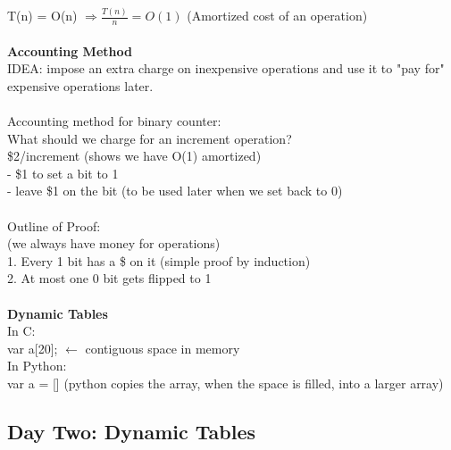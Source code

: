 \documentclass{article}
\begin{document}
	T(n) = O(n) $\Rightarrow \frac{T(n)}{n} = O(1)$ (Amortized cost of an operation)\\\\
	\textbf{Accounting Method\\}
	IDEA: impose an extra charge on inexpensive operations and use it to "pay for" expensive operations later.\\\\
	Accounting method for binary counter:\\
	What should we charge for an increment operation?\\
	\$2/increment (shows we have O(1) amortized)\\
	- \$1 to set a bit to 1\\
	- leave \$1 on the bit (to be used later when we set back to 0)\\\\
	Outline of Proof:\\
	(we always have money for operations)\\
	1. Every 1 bit has a \$ on it (simple proof by induction)\\
	2. At most one 0 bit gets flipped to 1\\\\
	\textbf{Dynamic Tables\\}
	In C:\\
	var a[20]; $\leftarrow$ contiguous space in memory\\
	In Python:\\
	var a = [] (python copies the array, when the space is filled, into a larger array)\\
	
	\subsection{Day Two: Dynamic Tables}
	
\end{document}
